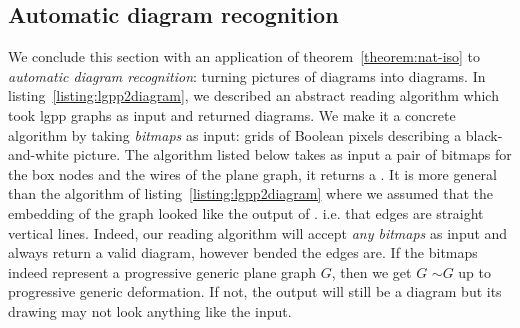 \subsection{Automatic diagram recognition}

We conclude this section with an application of theorem~\ref{theorem:nat-iso} to \emph{automatic diagram recognition}: turning pictures of diagrams into diagrams.
In listing~\ref{listing:lgpp2diagram}, we described an abstract reading algorithm which took lgpp graphs as input and returned diagrams.
We make it a concrete algorithm by taking \emph{bitmaps} as input: grids of Boolean pixels describing a black-and-white picture.
The algorithm  listed below takes as input a pair of bitmaps for the box nodes and the wires of the plane graph, it returns a .
It is more general than the  algorithm of listing~\ref{listing:lgpp2diagram} where we assumed that the embedding of the graph looked like the output of . i.e. that edges are straight vertical lines.
Indeed, our reading algorithm will accept \emph{any bitmaps} as input and always return a valid diagram, however bended the edges are.
If the bitmaps indeed represent a progressive generic plane graph $G$, then we get  $G$  $\sim G$ up to progressive generic deformation.
If not, the output will still be a diagram but its drawing may not look anything like the input.

